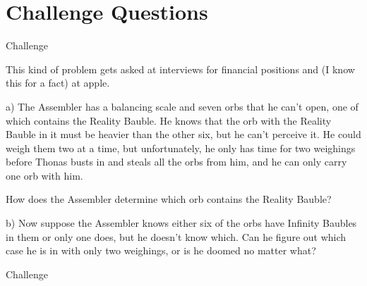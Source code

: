 \section{Challenge Questions}

\begin{tagblock}{Challenge}
\begin{question}[CHALLENGE!!!]
	This kind of problem gets asked at interviews for financial positions and (I know this for a fact) at apple. 

\bigskip

a) The  Assembler has a balancing scale and seven orbs that he can't open, one of which contains the Reality Bauble. He knows that the orb with the Reality Bauble in it must be heavier than the other six, but he can't perceive it. He could weigh them two at a time, but unfortunately, he only has time for two weighings before Thonas busts in and steals all the orbs from him, and he can only carry one orb with him. 

How does the  Assembler determine which orb contains the Reality Bauble?

\bigskip

b) Now suppose the  Assembler knows either six of the orbs have Infinity Baubles in them or only one does, but he doesn't know which. Can he figure out which case he is in with only two weighings, or is he doomed no matter what?
	
	
\begin{tags}
	    Challenge
\end{tags}
	
\begin{diary}
\end{diary}
		
\begin{solution}
       
\end{solution}

\end{question}

\end{tagblock}


